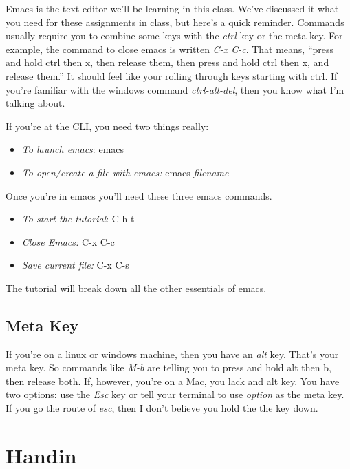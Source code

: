 \documentclass[]{tufte-handout}
\begin{document}
Emacs is the text editor we'll be learning in this class. We've discussed it what you need for these assignments in class, but here's a quick reminder. Commands usually require you to combine some keys with the \textit{ctrl} key or the meta key. For example, the command to close emacs is written \textit{C-x C-c}. That means, ``press and hold ctrl then x, then release them, then press and hold ctrl then x, and release them.''  It should feel like your rolling through keys starting with ctrl.  If you're familiar with the windows command \textit{ctrl-alt-del}, then you know what I'm talking about. 

If you're at the CLI, you need two things really:
\begin{itemize}
\item \textit{To launch emacs}: emacs
\item \textit{To open/create a file with emacs:} emacs \textit{filename}
\end{itemize}

Once you're in emacs you'll need these three emacs commands.
\begin{itemize}
\item \textit{To start the tutorial}: C-h t
\item \textit{Close Emacs:} C-x C-c
\item \textit{Save current file:} C-x C-s
\end{itemize}

The tutorial will break down all the other essentials of emacs.

\subsection{Meta Key}

If you're on a linux or windows machine, then you have an \textit{alt} key. That's your meta key. So commands like \textit{M-b} are telling you to press and hold alt then b, then release both. If, however, you're on a Mac, you lack and alt key. You have two options: use the \textit{Esc} key or tell your terminal to use \textit{option} as the meta key.  If you go the route of \textit{esc}, then I don't believe you hold the the key down.

\section{Handin}
\end{document}
